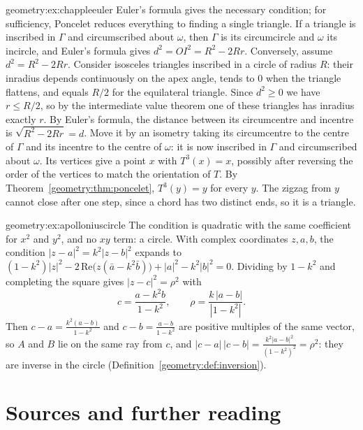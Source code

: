 \begin{solution}{geometry:ex:chappleeuler}
\idea Euler's formula gives the necessary condition; for sufficiency, Poncelet reduces everything to finding a single triangle.
\writeup If a triangle is inscribed in $\Gamma$ and circumscribed about $\omega$, then $\Gamma$ is its circumcircle and $\omega$ its incircle, and Euler's
formula gives $d^2=OI^2=R^2-2Rr$. Conversely, assume $d^2=R^2-2Rr$. Consider isosceles triangles inscribed in a circle of radius $R$: their inradius
depends continuously on the apex angle, tends to $0$ when the triangle flattens, and equals $R/2$ for the equilateral triangle. Since $d^2\ge0$ we
have $r\le R/2$, so by the intermediate value theorem one of these triangles has inradius exactly $r$. By Euler's formula, the distance between its
circumcentre and incentre is $\sqrt{R^2-2Rr}=d$. Move it by an isometry taking its circumcentre to the centre of $\Gamma$ and its incentre to the
centre of $\omega$: it is now inscribed in $\Gamma$ and circumscribed about $\omega$. Its vertices give a point $x$ with $T^3(x)=x$, possibly after
reversing the order of the vertices to match the orientation of $T$. By Theorem~\ref{geometry:thm:poncelet}, $T^3(y)=y$ for every $y$. The zigzag from $y$
cannot close after one step, since a chord has two distinct ends, so it is a triangle.
\end{solution}

\begin{solution}{geometry:ex:apolloniuscircle}
\idea The condition is quadratic with the same coefficient for $x^2$ and $y^2$, and no $xy$ term: a circle.
\writeup With complex coordinates $z,a,b$, the condition $|z-a|^2=k^2|z-b|^2$ expands to
$(1-k^2)|z|^2-2\,\mathrm{Re}\bigl(z(\bar a-k^2\bar b)\bigr)+|a|^2-k^2|b|^2=0$. Dividing by $1-k^2$ and completing the square gives $|z-c|^2=\rho^2$ with
\[
c=\frac{a-k^2b}{1-k^2},\qquad \rho=\frac{k\,|a-b|}{|1-k^2|}.
\]
Then $c-a=\frac{k^2(a-b)}{1-k^2}$ and $c-b=\frac{a-b}{1-k^2}$ are positive multiples of the same vector, so $A$ and $B$ lie on the same ray from $c$, and
$|c-a|\,|c-b|=\frac{k^2|a-b|^2}{(1-k^2)^2}=\rho^2$: they are inverse in the circle (Definition~\ref{geometry:def:inversion}).
\end{solution}

\section*{Sources and further reading}

